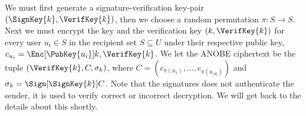 We must first generate a signature-verification key-pair \((\SignKey{k}, 
  \VerifKey{k})\), then we choose a random permutation \(\pi\colon S\to S\).
Next we must encrypt the key and the verification key \((k, \VerifKey{k})\) for 
every user \(u_i\in S\) in the recipient set \(S\subseteq U\) under their 
respective public key, \(c_{u_i} = \Enc[\PubKey{u_i}]{k, \VerifKey{k}}\).
We let the \ac{ANOBE} ciphertext be the tuple \((\VerifKey{k}, C, \sigma_k)\), 
where
\(C = ( c_{\pi(u_1)}, \ldots, c_{\pi(u_{|S|})})\) and
\(\sigma_k = \Sign[\SignKey{k}]{ C }\).
Note that the signatures does not authenticate the sender, it is used to verify 
correct or incorrect decryption.
We will get back to the details about this shortly.

\begin{frame}
  \begin{figure}
    \begin{algorithmic}[1]

        \pause{}

        \EndFor{}

        \pause{}

      \EndFunction{}
    \end{algorithmic}
  \end{figure}
\end{frame}

